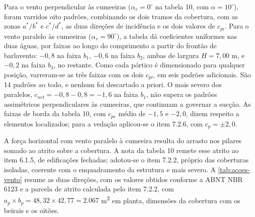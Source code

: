 Para o vento perpendicular às cumeeiras ($\alpha_v = 0^{\circ}$ na tabela 10, com
$\alpha = 10^{\circ}$), foram varridos oito padrões, combinando os dois tramos da
cobertura, com as zonas $a^*/b^*$ e $c^*/d^*$, as duas direções de incidência e
os dois valores de $c_{pi}$. Para o vento paralelo às cumeeiras
($\alpha_v = 90^{\circ}$), a tabela dá coeficientes uniformes nas duas águas, por
faixas ao longo do comprimento a partir do frontão de barlavento: $-0{,}8$ na
faixa $b_1$, $-0{,}6$ na faixa $b_2$, ambas de largura $H = 7{,}00$ m, e $-0{,}2$ na
faixa $b_3$, no restante. Como cada pórtico é dimensionado para qualquer posição,
varreram-se as três faixas com os dois $c_{pi}$, em seis padrões adicionais. São
14 padrões ao todo, e nenhum foi descartado a priori. O mais severo dos
paralelos, $c_{net} = -0{,}8 - 0{,}8 = -1{,}6$ na faixa $b_1$, não supera os
padrões assimétricos perpendiculares às cumeeiras, que continuam a governar a
sucção. As faixas de borda da tabela 10, com $c_{pe}$ médio de $-1{,}5$ e $-2{,}0$,
dizem respeito a elementos localizados; para a vedação aplicou-se o item 7.2.6,
com $c_p = \pm 2{,}0$.

A força horizontal com vento paralelo à cumeeira resulta do arrasto nos pilares
somado ao atrito sobre a cobertura. A nota da tabela 10 remete esse atrito ao
item 6.1.5, de edificações fechadas; adotou-se o item 7.2.2, próprio das
coberturas isoladas, coerente com o enquadramento da estrutura e mais severo. A \autoref{tab:acoes-vento} resume as duas direções, com os valores
obtidos conforme a ABNT NBR 6123 \cite{NBR6123:2023} e a parcela de atrito
calculada pelo item 7.2.2, com $a_p \times b_p = 48{,}32 \times 42{,}77 = 2.067$
m\textsuperscript{2} em planta, dimensões da cobertura com os beirais e os oitões.


